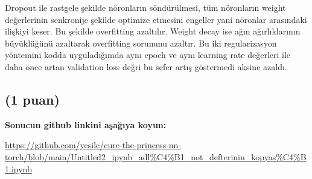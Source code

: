 \documentclass[11pt]{article}
\begin{document}
Dropout ile rastgele şekilde nöronların söndürülmesi, tüm nöronların weight değerlerinin senkronije şekilde optimize etmesini engeller yani nöronlar arasındaki ilişkiyi keser. Bu şekilde overfitting azaltılır.
Weight decay ise ağın ağırlıklarının büyüklüğünü azaltarak overfitting sorununu azaltır. Bu iki regularizasyon yöntemini kodda uyguladığımda aynı epoch ve aynı learning rate değerleri ile daha önce artan validation loss değri bu sefer artış göstermedi aksine azaldı.

\subsection{(1 puan)} \textbf{Sonucun github linkini  aşağıya koyun:}

\url{https://github.com/yesilc/cure-the-princess-nn-torch/blob/main/Untitled2_ipynb_adl%C4%B1_not_defterinin_kopyas%C4%B1.ipynb}
\end{document}
